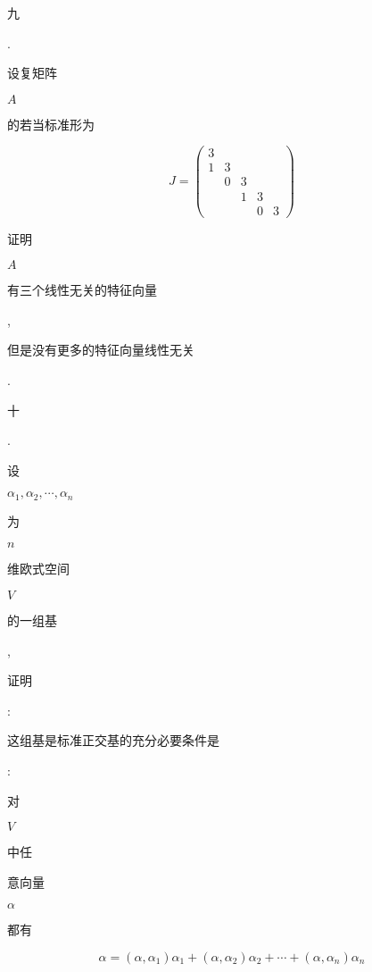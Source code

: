 \documentclass[10pt]{article}
\begin{document}
\begin{CJK}{UTF8}{mj}九\end{CJK}. \begin{CJK}{UTF8}{mj}设复矩阵\end{CJK} $A$ \begin{CJK}{UTF8}{mj}的若当标准形为\end{CJK}
$$
J=\left(\begin{array}{lllll}
3 & & & & \\
1 & 3 & & & \\
& 0 & 3 & & \\
& & 1 & 3 & \\
& & & 0 & 3
\end{array}\right)
$$
\begin{CJK}{UTF8}{mj}证明\end{CJK} $A$ \begin{CJK}{UTF8}{mj}有三个线性无关的特征向量\end{CJK}, \begin{CJK}{UTF8}{mj}但是没有更多的特征向量线性无关\end{CJK}.

\begin{CJK}{UTF8}{mj}十\end{CJK}. \begin{CJK}{UTF8}{mj}设\end{CJK} $\alpha_{1}, \alpha_{2}, \cdots, \alpha_{n}$ \begin{CJK}{UTF8}{mj}为\end{CJK} $n$ \begin{CJK}{UTF8}{mj}维欧式空间\end{CJK} $V$ \begin{CJK}{UTF8}{mj}的一组基\end{CJK}, \begin{CJK}{UTF8}{mj}证明\end{CJK}: \begin{CJK}{UTF8}{mj}这组基是标准正交基的充分必要条件是\end{CJK}: \begin{CJK}{UTF8}{mj}对\end{CJK} $V$ \begin{CJK}{UTF8}{mj}中任\end{CJK} \begin{CJK}{UTF8}{mj}意向量\end{CJK} $\alpha$ \begin{CJK}{UTF8}{mj}都有\end{CJK}
$$
\alpha=\left(\alpha, \alpha_{1}\right) \alpha_{1}+\left(\alpha, \alpha_{2}\right) \alpha_{2}+\cdots+\left(\alpha, \alpha_{n}\right) \alpha_{n}
$$
\end{document}
